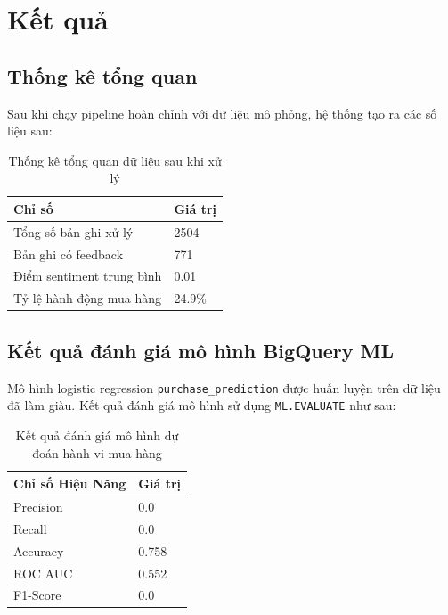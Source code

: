 \section{Kết quả}

\subsection{Thống kê tổng quan}

Sau khi chạy pipeline hoàn chỉnh với dữ liệu mô phỏng, hệ thống tạo ra các số liệu sau:

\begin{table}[H]
\centering
\begin{tabular}{|l|l|}
\hline
\textbf{Chỉ số} & \textbf{Giá trị} \\
\hline
Tổng số bản ghi xử lý & {\small 2504} \\
\hline
Bản ghi có feedback & {\small 771} \\
\hline
Điểm sentiment trung bình & {\small 0.01} \\
\hline
Tỷ lệ hành động mua hàng & {\small 24.9\%} \\
\hline
\end{tabular}
\caption{Thống kê tổng quan dữ liệu sau khi xử lý}
\end{table}

\subsection{Kết quả đánh giá mô hình BigQuery ML}

Mô hình logistic regression \texttt{purchase\_prediction} được huấn luyện trên dữ liệu đã làm giàu. Kết quả đánh giá mô hình sử dụng \texttt{ML.EVALUATE} như sau:

\begin{table}[H]
\centering
\begin{tabular}{|l|l|}
\hline
\textbf{Chỉ số Hiệu Năng} & \textbf{Giá trị} \\
\hline
Precision & {\small 0.0} \\
\hline
Recall & {\small 0.0} \\
\hline
Accuracy & {\small 0.758} \\
\hline
ROC AUC & {\small 0.552} \\
\hline
F1-Score & {\small 0.0} \\
\end{tabular}
\caption{Kết quả đánh giá mô hình dự đoán hành vi mua hàng}
\end{table}

